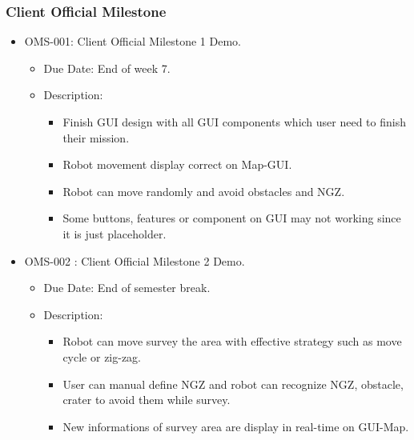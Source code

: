 	\subsubsection{Client Official Milestone}
		\begin{itemize}
			\item OMS-001: Client Official Milestone 1 Demo.
			\begin{itemize}
				\item Due Date: End of week 7.
				\item Description:
				\begin{itemize}
					\item Finish GUI design with all GUI components which user need to finish their mission.
					\item Robot movement display correct on Map-GUI.
					\item Robot can move randomly and avoid obstacles and NGZ.
					\item Some buttons, features or component on GUI may not working since it is just placeholder. 
				\end{itemize}
			\end{itemize}
			\item OMS-002 : Client Official Milestone 2 Demo.
			\begin{itemize}
				\item Due Date: End of semester break.
				\item Description:
				\begin{itemize}
					\item Robot can move survey the area with effective strategy such as move cycle or zig-zag.
					\item User can manual define NGZ and robot can recognize NGZ, obstacle, crater to avoid them while survey.
					\item New informations of survey area are display in real-time on GUI-Map.
				\end{itemize}
			\end{itemize}
		\end{itemize}
	
